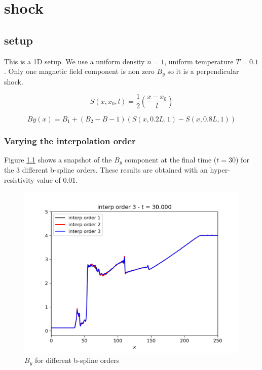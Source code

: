 
\chapter{shock}

\section{setup}
This is a 1D setup. We use a uniform density $n=1$, uniform temperature $T=0.1$.
Only one magnetic field component is non zero $B_y$ so it is a perpendicular shock.


\begin{equation}
S\left(x,x_0,l\right) = \frac{1}{2} \left(\frac{x-x_0}{l}\right)
\end{equation}


\begin{equation}
By(x) = B_1 + (B_2-B-1) \left(S\left(x,0.2L, 1\right) - S\left(x,0.8L, 1\right)  \right)
\end{equation}


 \subsection{Varying the interpolation order}

Figure \ref{fig:shock_bspline_order} shows a snapshot of the $B_y$ component
at the final time ($t=30$) for the 3 different b-spline orders.
These results are obtained with an hyper-resistivity value of 0.01.

\begin{figure}[!t]
\centering
\includegraphics{shock/shock_By}
\caption{$B_y$ for different b-spline orders}
\label{fig:shock_bspline_order}
\end{figure}


